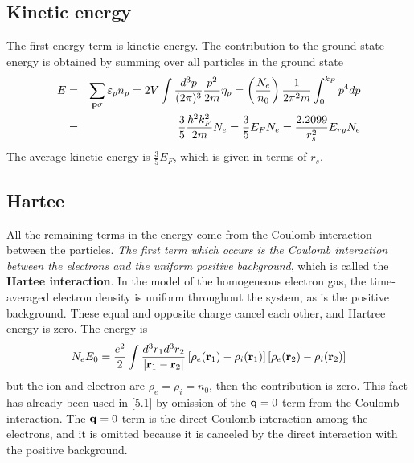 \subsection{Kinetic energy}
The first energy term is kinetic energy.
The contribution to the ground state energy is obtained by summing over all particles in the ground state
\begin{eqnarray}
    E &=& \sum_{\mathbf{p} \sigma} \varepsilon_p n_p = 2 V \int \frac{d^3 p}{(2\pi)^3} \frac{p^2}{2m} \eta_p = \left( \frac{N_e}{n_0} \right) \frac{1}{2\pi^2 m} \int_0^{k_F} p^4 dp \nonumber \\
&=& \frac{3}{5} \frac{\hbar^2 k_F^2}{2m} N_e = \frac{3}{5} E_F N_e = \frac{2.2099}{r_s^2} E_{ry} N_e    \label{5.8}
\end{eqnarray}
The average kinetic energy is $ \frac{3}{5} E_F$, which is given in terms of $r_s$.

\subsection{Hartee}
All the remaining terms in the energy come from the Coulomb interaction between the particles.
\textit{The first term which occurs is the Coulomb interaction between the electrons and the uniform positive background}, which is called the \textbf{Hartee interaction}.
In the model of the homogeneous electron gas, the time-averaged electron density is uniform throughout the system, as is the positive background.
These equal and opposite charge cancel each other, and Hartree energy is zero.
The energy is
\begin{equation}
    N_e E_0 = \frac{e^2}{2} \int \frac{d^3 r_1 d^3 r_2}{\abs{\mathbf{r}_1 - \mathbf{r}_2}} \left[ \rho_e(\mathbf{r}_1) - \rho_i(\mathbf{r}_1) \right] \left[ \rho_e(\mathbf{r}_2) - \rho_i(\mathbf{r}_2) \right]  \label{5.9}
\end{equation}
but the ion and electron are $\rho_e = \rho_i = n_0$, then the contribution is zero.
This fact has already been used in \eqref{5.1} by omission of the $\mathbf{q}=0$ term from the Coulomb interaction.
The $\mathbf{q}=0$ term is the direct Coulomb interaction among the electrons, and it is omitted because it is canceled by the direct interaction with the positive background.

